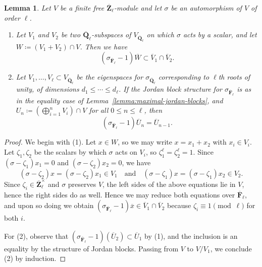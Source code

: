 \documentclass[reqno]{amsart}
\numberwithin{equation}{subsection}
\newcommand{\F}{\mathbf{F}}
\newcommand{\Q}{\mathbf{Q}}
\newcommand{\Z}{\mathbf{Z}}
\newcommand{\ol}[1]{\overline{#1}}
\newtheorem{lemma}[thm]{Lemma}
\theoremstyle{remark}
\numberwithin{equation}{subsection}
\numberwithin{figure}{subsection}
\begin{document}
\begin{lemma}\label{lemma:order-ell-special-fiber-filtration}
    Let $V$ be a finite free $\ol\Z_\ell$-module and let $\sigma$ be an automorphism of $V$ of order $\ell$.
    \begin{enumerate}
        \item Let $V_1$ and $V_2$ be two $\ol\Q_\ell$-subspaces of $V_{\ol\Q_\ell}$ on which $\sigma$ acts by a scalar, and let $W \coloneqq (V_1 + V_2) \cap V$. Then we have
        \[
        (\sigma_{\ol\F_\ell} - 1)\ol W  \subset \ol V_1 \cap \ol V_2.
        \]
        \item Let $V_1, \dots, V_\ell \subset V_{\ol\Q_\ell}$ be the eigenspaces for $\sigma_{\ol\Q_\ell}$ corresponding to $\ell$th roots of unity, of dimensions $d_1 \leq \cdots \leq d_\ell$. If the Jordan block structure for $\sigma_{\ol\F_\ell}$ is as in the equality case of Lemma~\ref{lemma:maximal-jordan-blocks}, and $U_n \coloneqq (\bigoplus_{i=1}^n V_i) \cap V$ for all $0 \leq n \leq \ell$, then
        \[
        (\sigma_{\ol\F_\ell} - 1)\ol U_n = \ol U_{n-1}.
        \]
    \end{enumerate}
\end{lemma}

\begin{proof}
    We begin with (1). Let $x \in W$, so we may write $x = x_1 + x_2$ with $x_i \in V_i$. Let $\zeta_1, \zeta_2$ be the scalars by which $\sigma$ acts on $V_i$, so $\zeta_1^\ell = \zeta_2^\ell = 1$. Since $(\sigma - \zeta_1)x_1 = 0$ and $(\sigma-\zeta_2)x_2 = 0$, we have
    \[
    (\sigma-\zeta_2) x = (\sigma-\zeta_2)x_1  \in V_1 \quad \text{and} \quad (\sigma-\zeta_1)x = (\sigma-\zeta_1) x_2 \in V_2.
    \]
    Since $\zeta_i \in \ol \Z_\ell^\times$ and $\sigma$ preserves $V$, the left sides of the above equations lie in $V$, hence the right sides do as well. Hence we may reduce both equations over $\ol \F_\ell$, and upon so doing we obtain $(\sigma_{\ol\F_\ell} - 1) \ol x \in \ol V_1 \cap \ol V_2$ because $\zeta_i \equiv 1 \pmod{\ell}$ for both $i$. 
    
    For (2), observe that $(\sigma_{\ol\F_\ell} - 1)(\ol U_2) \subset \ol U_1$ by (1), and the inclusion is an equality by the structure of Jordan blocks. Passing from $V$ to $V/V_1$, we conclude (2) by induction.
\end{proof}
\end{document}
